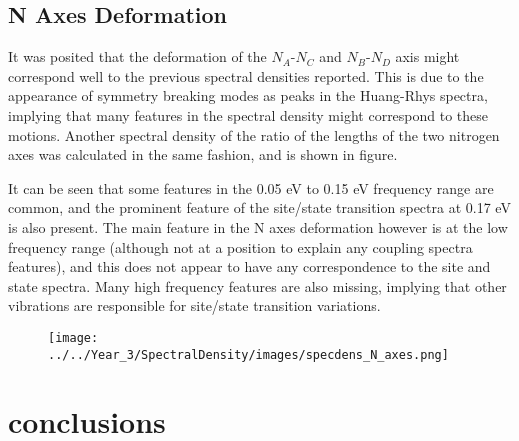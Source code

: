 \subsection{N Axes Deformation}
\label{subsec:N_axes_deformation}

It was posited that the deformation of the $N_A$-$N_C$ and $N_B$-$N_D$ axis might
correspond well to the previous spectral densities reported. This is due to the 
appearance of symmetry breaking modes as peaks in the Huang-Rhys spectra, implying
that many features in the spectral density might correspond to these motions. Another
spectral density of the ratio of the lengths of the two nitrogen axes was calculated
in the same fashion, and is shown in figure.

It can be seen that some features in the 0.05 eV to 0.15 eV frequency range are 
common, and the prominent feature of the site/state transition spectra at 0.17 eV
is also present. The main feature in the N axes deformation however is at the low
frequency range (although not at a position to explain any coupling spectra features), 
and this does not appear to have any correspondence to the site and state spectra.
Many high frequency features are also missing, implying that other vibrations are
responsible for site/state transition variations.

\begin{figure}
    \centering
    \texttt{[image: ../../Year\_3/SpectralDensity/images/specdens\_N\_axes.png]}
\end{figure}

\section{conclusions}
\label{sec:specdens_concs}

